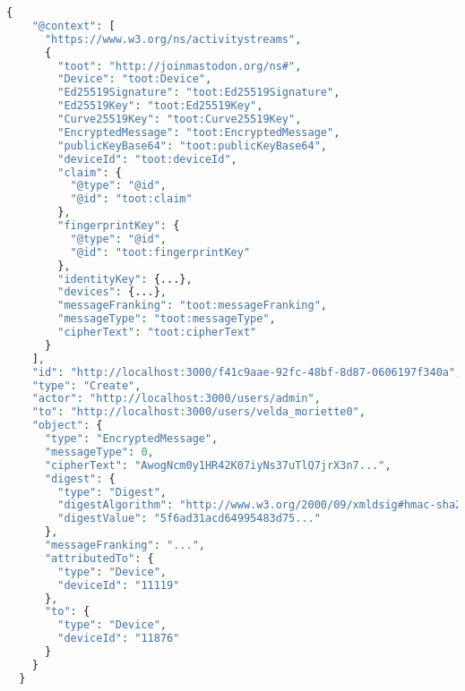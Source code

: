 \lstset{style=JSONStyle}
\begin{lstlisting}[language=PHP, caption=Example of encrypted message using Mastodon's E2EE API and extended JSON-LD vocabulary, label=appendix:e2e, float=ht]
  {
    "@context": [
      "https://www.w3.org/ns/activitystreams",
      {
        "toot": "http://joinmastodon.org/ns#",
        "Device": "toot:Device",
        "Ed25519Signature": "toot:Ed25519Signature",
        "Ed25519Key": "toot:Ed25519Key",
        "Curve25519Key": "toot:Curve25519Key",
        "EncryptedMessage": "toot:EncryptedMessage",
        "publicKeyBase64": "toot:publicKeyBase64",
        "deviceId": "toot:deviceId",
        "claim": {
          "@type": "@id",
          "@id": "toot:claim"
        },
        "fingerprintKey": {
          "@type": "@id",
          "@id": "toot:fingerprintKey"
        },
        "identityKey": {...},
        "devices": {...},
        "messageFranking": "toot:messageFranking",
        "messageType": "toot:messageType",
        "cipherText": "toot:cipherText"
      }
    ],
    "id": "http://localhost:3000/f41c9aae-92fc-48bf-8d87-0606197f340a",
    "type": "Create",
    "actor": "http://localhost:3000/users/admin",
    "to": "http://localhost:3000/users/velda_moriette0",
    "object": {
      "type": "EncryptedMessage",
      "messageType": 0,
      "cipherText": "AwogNcm0y1HR42K07iyNs37uTlQ7jrX3n7...",
      "digest": {
        "type": "Digest",
        "digestAlgorithm": "http://www.w3.org/2000/09/xmldsig#hmac-sha256",
        "digestValue": "5f6ad31acd64995483d75..."
      },
      "messageFranking": "...",
      "attributedTo": {
        "type": "Device",
        "deviceId": "11119"
      },
      "to": {
        "type": "Device",
        "deviceId": "11876"
      }
    }
  }
\end{lstlisting}